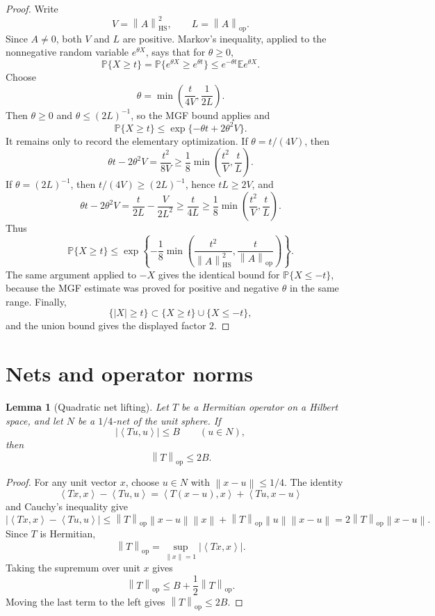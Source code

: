 \documentclass[11pt,oneside]{book}
\newtheorem{lemma}[theorem]{Lemma}
\newcommand{\E}{\mathbb E}
\newcommand{\Prob}{\mathbb P}
\newcommand{\1}{\mathbf 1}
\newcommand{\HS}{\mathrm{HS}}
\newcommand{\op}{\mathrm{op}}
\newcommand{\norm}[1]{\left\|#1\right\|}
\newcommand{\ip}[2]{\left\langle #1,#2\right\rangle}
\begin{document}
\begin{proof}
Write
\[
  V=\norm A_{\HS}^2,\qquad L=\norm A_{\op}.
\]
Since \(A\ne0\), both \(V\) and \(L\) are positive.  Markov's inequality,
applied to the nonnegative random variable \(e^{\theta X}\), says that for
\(\theta\ge0\),
\[
  \Prob\{X\ge t\}
  =
  \Prob\{e^{\theta X}\ge e^{\theta t}\}
  \le e^{-\theta t}\E e^{\theta X}.
\]
Choose
\[
  \theta=\min\left(\frac{t}{4V},\frac1{2L}\right).
\]
Then \(\theta\ge0\) and \(\theta\le(2L)^{-1}\), so the MGF bound applies and
\[
  \Prob\{X\ge t\}
  \le
  \exp\{-\theta t+2\theta^2V\}.
\]
It remains only to record the elementary optimization.  If
\(\theta=t/(4V)\), then
\[
  \theta t-2\theta^2V=\frac{t^2}{8V}
  \ge \frac18\min\left(\frac{t^2}{V},\frac{t}{L}\right).
\]
If \(\theta=(2L)^{-1}\), then \(t/(4V)\ge(2L)^{-1}\), hence
\(tL\ge2V\), and
\[
  \theta t-2\theta^2V
  =\frac{t}{2L}-\frac{V}{2L^2}
  \ge \frac{t}{4L}
  \ge \frac18\min\left(\frac{t^2}{V},\frac{t}{L}\right).
\]
Thus
\[
  \Prob\{X\ge t\}
  \le
  \exp\left\{
    -\frac18\min\left(\frac{t^2}{\norm A_{\HS}^2},
                      \frac{t}{\norm A_{\op}}\right)
  \right\}.
\]
The same argument applied to \(-X\) gives the identical bound for
\(\Prob\{X\le -t\}\), because the MGF estimate was proved for positive and
negative \(\theta\) in the same range.  Finally,
\[
  \{|X|\ge t\}\subset \{X\ge t\}\cup\{X\le -t\},
\]
and the union bound gives the displayed factor \(2\).
\end{proof}

\section{Nets and operator norms}

\begin{lemma}[Quadratic net lifting]
Let \(T\) be a Hermitian operator on a Hilbert space, and let \(N\) be a
\(1/4\)-net of the unit sphere.  If
\[
  |\ip{Tu}{u}|\le B\qquad(u\in N),
\]
then
\[
  \norm T_{\op}\le 2B.
\]
\end{lemma}

\begin{proof}
For any unit vector \(x\), choose \(u\in N\) with \(\norm{x-u}\le1/4\).  The
identity
\[
  \ip{Tx}{x}-\ip{Tu}{u}
  =
  \ip{T(x-u)}{x}+\ip{Tu}{x-u}
\]
and Cauchy's inequality give
\[
  |\ip{Tx}{x}-\ip{Tu}{u}|
  \le
  \norm T_{\op}\norm{x-u}\norm x
  +
  \norm T_{\op}\norm u\norm{x-u}
  =
  2\norm T_{\op}\norm{x-u}.
\]
Since \(T\) is Hermitian,
\[
  \norm T_{\op}=\sup_{\norm x=1}|\ip{Tx}{x}|.
\]
Taking the supremum over unit \(x\) gives
\[
  \norm T_{\op}\le B+\frac12\norm T_{\op}.
\]
Moving the last term to the left gives \(\norm T_{\op}\le2B\).
\end{proof}
\end{document}
